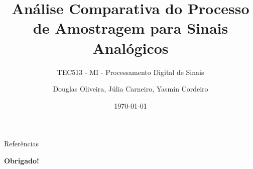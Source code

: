\documentclass[10pt,aspectratio=169]{beamer}
\title{Análise Comparativa do Processo de Amostragem para Sinais Analógicos}
\subtitle{TEC513 - MI - Processamento Digital de Sinais}
\author{Douglas Oliveira, Júlia Carneiro, Yasmin Cordeiro}
\institute[Engenharia da Computação]{Universidade Estadual de Feira de Santana}
\date{\today}
\begin{document}
\maketitle %








\begin{frame}[allowframebreaks]{Referências}

	

\end{frame}

\begin{frame}[plain]
	\vfill
	\centering
	{\color{themeblue2}\fontsize{40}{48}\selectfont\bfseries Obrigado!}
	\vfill
\end{frame}
\end{document}
